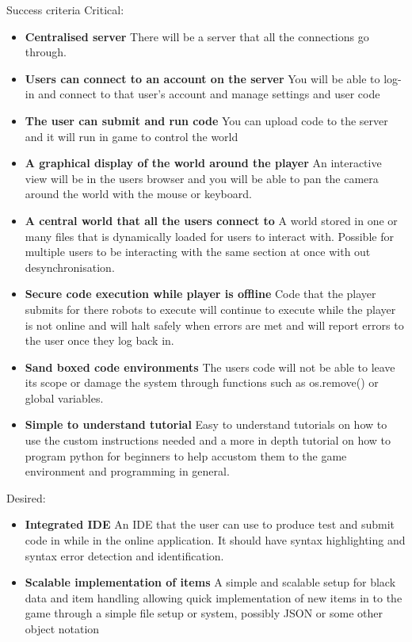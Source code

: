 \documentclass[12pt]{article}
\begin{document}
Success criteria
Critical:
\begin{itemize}
    \item \textbf{Centralised server}\newline
    There will be a server that all the connections go through.
    \item \textbf{Users can connect to an account on the server}\newline
    You will be able to log-in and connect to that user's account and manage settings and user code
    \item \textbf{The user can submit and run code}\newline
    You can upload code to the server and it will run in game to control the world
    \item \textbf{A graphical display of the world around the player}\newline
    An interactive view will be in the users browser and you will be able to pan the camera around the world with the mouse or keyboard.
    \item \textbf{A central world that all the users connect to}\newline
    A world stored in one or many files that is dynamically loaded for users to interact with. Possible for multiple users to be interacting with the same section at once with out desynchronisation.
    \item \textbf{Secure code execution while player is offline}\newline
    Code that the player submits for there robots to execute will continue to execute while the player is not online and will halt safely when errors are met and will report errors to the user once they log back in.
    \item \textbf{Sand boxed code environments}\newline
    The users code will not be able to leave its scope or damage the system through functions such as os.remove() or global variables.
    \item \textbf{Simple to understand tutorial}\newline
    Easy to understand tutorials on how to use the custom instructions needed and a more in depth tutorial on how to program python for beginners to help accustom them to the game environment and programming in general.
    
\end{itemize}
Desired:
\begin{itemize}
    \item \textbf{Integrated IDE}\newline
    An IDE that the user can use to produce test and submit code in while in the online application. It should have syntax highlighting and syntax error detection and identification.
    \item \textbf{Scalable implementation of items}\newline
    A simple and scalable setup for black data and item handling allowing quick implementation of new items in to the game through a simple file setup or system, possibly JSON or some other object notation
\end{itemize}
\end{document}
